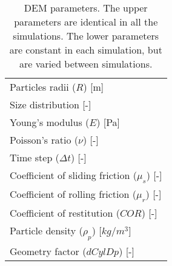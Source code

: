 \begin{table}[h]
\centering
\begin{tabular}{l}
\hline 
    Particles radii ($R$) [m]   \\ [5pt]

	Size distribution [-] \\ [5pt]

    Young's modulus ($E$) [Pa] \\ [5pt]

    Poisson's ratio ($\nu$) [-] \\ 
     Time step ($\Delta t$) [-] \\ [5pt]
        \hline
     Coefficient of sliding friction ($\mu_s$) [-] \\  [5pt]
    Coefficient of rolling friction ($\mu_r$) [-] \\ [5pt]
    Coefficient of restitution ($COR$) [-] \\ [5pt]
     Particle density ($\rho_p$) [$kg/m^3$] \\ [5pt]
    Geometry factor ($dCylDp$) [-] \\ [5pt]
   
\hline
\end{tabular}
\caption[DEM parameters]{DEM parameters. The upper parameters are
identical in all the simulations. The lower parameters are constant in each
simulation, but are varied between simulations.}
\label{tab:08DEMparameters}
\end{table}

